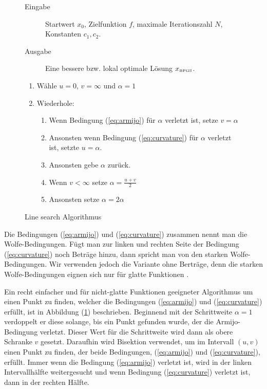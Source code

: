 \documentclass[runningheads,a4paper]{llncs}
\begin{document}
\begin{figure}[ht]
 \centering
 \begin{description}
 \item[Eingabe] Startwert $x_0$, Zielfunktion $f$, maximale Iterationszahl $N$, Konstanten $c_1,c_2$.
 \item[Ausgabe] Eine bessere bzw. lokal optimale Lösung $x_{\text{\tiny{BFGS}}}$.
 \end{description}
 \begin{enumerate}
 	\item Wähle $u=0$, $v=\infty$ und $\alpha = 1$
 	\item Wiederhole:
 	\begin{enumerate}
 	\item Wenn Bedingung (\ref{eq:armijo}) für $\alpha$ verletzt ist, setze $v=\alpha$
 	\item Ansonsten wenn Bedingung (\ref{eq:curvature}) für $\alpha$ verletzt ist, setzte $u=\alpha$.
 	\item Ansonsten gebe $\alpha$ zurück.
 	\item Wenn $v < \infty$ setze $\alpha = \frac{u+v}{2}$
 	\item Ansonsten setze $\alpha = 2\alpha$
 	\end{enumerate}
 \end{enumerate}
 \caption{Line search Algorithmus \cite{DBLP:journals/mp/LewisO13}}
 \label{alg:linesearch}
\end{figure}

Die Bedingungen (\ref{eq:armijo}) und (\ref{eq:curvature}) zusammen nennt man die Wolfe-Bedingungen. Fügt man zur linken und rechten Seite der Bedingung (\ref{eq:curvature}) noch Beträge hinzu, dann spricht man von den starken Wolfe-Bedingungen. Wir verwenden jedoch die Variante ohne Berträge, denn die starken Wolfe-Bedingungen eignen sich nur für glatte Funktionen \cite{DBLP:journals/mp/LewisO13}.

Ein recht einfacher und für nicht-glatte Funktionen geeigneter Algorithmus um einen Punkt zu finden, welcher die Bedingungen (\ref{eq:armijo}) und (\ref{eq:curvature}) erfüllt, ist in Abbildung (\ref{alg:linesearch}) beschrieben. Beginnend mit der Schrittweite $\alpha=1$ verdoppelt er diese solange, bis ein Punkt gefunden wurde, der die Armijo-Bedingung verletzt. Dieser Wert für die Schrittweite wird dann als obere Schranke $v$ gesetzt. Daraufhin wird Bisektion verwendet, um im Intervall $(u,v)$ einen Punkt zu finden, der beide Bedingungen, (\ref{eq:armijo}) und (\ref{eq:curvature}), erfüllt. Immer wenn die Bedingung (\ref{eq:armijo}) verletzt ist, wird in der linken Intervallhälfte weitergesucht und wenn Bedingung (\ref{eq:curvature}) verletzt ist, dann in der rechten Hälfte.
\end{document}

